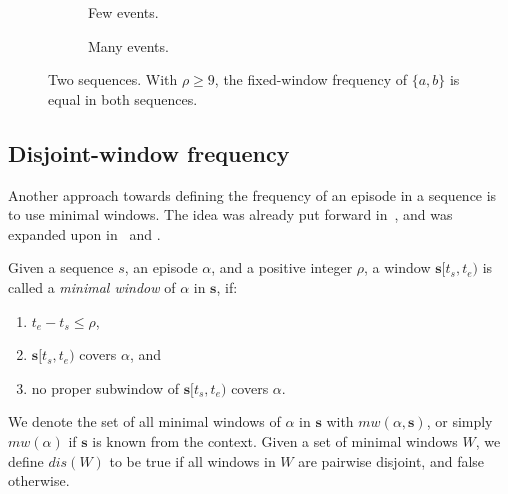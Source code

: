 \begin{figure}

\begin{subfigure}[b]{\textwidth}
\centering
{}

\caption{Few events.}
\label{fig:few-events}
\end{subfigure}

\par\bigskip

\begin{subfigure}[b]{\textwidth}
\centering
{}

\caption{Many events.}
\label{fig:many-events}
\end{subfigure}

\caption{Two sequences. With $ \rho \geq 9 $, the fixed-window frequency of $ \{ a, b \} $ is equal in both sequences.}
\label{fig:many-vs-few-events}
\end{figure}

\subsection{Disjoint-window frequency}

Another approach towards defining the frequency of an episode in a sequence is to use minimal windows. The idea was already put forward in~\citep{mannila1997discovery}, and was expanded upon in~\cite{laxman2005discovering} and \citep{laxman2007fast}.

\begin{definition} \label{def:minimal-window}
Given a sequence $ s $, an episode $ \alpha $, and a positive integer $ \rho $, a window $ \boldsymbol{s}[t_s, t_e) $ is called a \emph{minimal window} of $ \alpha $ in $ \boldsymbol{s} $, if:
\begin{enumerate}
\item $ t_e - t_s \leq \rho $, \label{min-win-requirement-window-width-limit}
\item $ \boldsymbol{s}[t_s, t_e) $ covers $ \alpha $, and
\item no proper subwindow of $ \boldsymbol{s}[t_s, t_e) $ covers $ \alpha $.
\end{enumerate}

We denote the set of all minimal windows of $ \alpha $ in $ \boldsymbol{s} $ with $ mw(\alpha, \boldsymbol{s}) $, or simply $ mw(\alpha) $ if $ \boldsymbol{s} $ is known from the context. Given a set of minimal windows $ W $, we define $ dis(W) $ to be true if all windows in $ W $ are pairwise disjoint, and false otherwise.
\end{definition}

